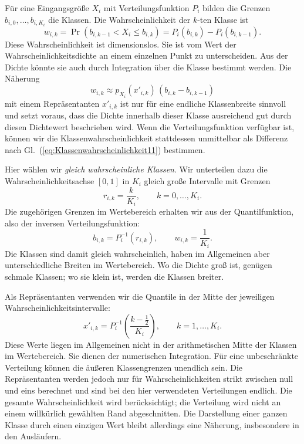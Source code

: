 Für eine Eingangsgröße $X_i$ mit Verteilungsfunktion $P_i$ bilden
die Grenzen $b_{i,0},\dots,b_{i,K_i}$ die Klassen.
Die Wahrscheinlichkeit der $k$-ten Klasse ist
\begin{equation}
w_{i,k}
=\Pr(b_{i,k-1}<X_i\leq b_{i,k})
=P_i(b_{i,k})-P_i(b_{i,k-1}).
\label{eq:Klassenwahrscheinlichkeit11}
\end{equation}
Diese Wahrscheinlichkeit ist dimensionslos. Sie ist vom Wert
der Wahrscheinlichkeitsdichte an einem einzelnen Punkt zu unterscheiden.
Aus der Dichte könnte sie auch durch Integration über die Klasse
bestimmt werden. Die Näherung
\begin{equation}
w_{i,k}\approx p_{X_i}(x'_{i,k})\,
(b_{i,k}-b_{i,k-1})
\end{equation}
mit einem Repräsentanten $x'_{i,k}$ ist nur für eine endliche
Klassenbreite sinnvoll und setzt voraus, dass die Dichte innerhalb
dieser Klasse ausreichend gut durch diesen Dichtewert beschrieben wird.
Wenn die Verteilungsfunktion verfügbar ist, können wir die
Klassenwahrscheinlichkeit stattdessen unmittelbar als Differenz
nach Gl.~(\ref{eq:Klassenwahrscheinlichkeit11}) bestimmen.

Hier wählen wir \emph{gleich wahrscheinliche Klassen}.
Wir unterteilen dazu die Wahrscheinlichkeitsachse $[0,1]$ in $K_i$
gleich große Intervalle mit Grenzen
\begin{equation}
r_{i,k}=\frac{k}{K_i},\qquad k=0,\dots,K_i.
\end{equation}
Die zugehörigen Grenzen im Wertebereich erhalten wir aus der
Quantilfunktion, also der inversen Verteilungsfunktion:
\begin{equation}
b_{i,k}=P_i^{-1}(r_{i,k}),
\qquad w_{i,k}=\frac{1}{K_i}.
\end{equation}
Die Klassen sind damit gleich wahrscheinlich, haben im Allgemeinen
aber unterschiedliche Breiten im Wertebereich.
Wo die Dichte groß ist, genügen schmale Klassen; wo sie klein ist,
werden die Klassen breiter.

Als Repräsentanten verwenden wir die Quantile in der Mitte der
jeweiligen Wahrscheinlichkeitsintervalle:
\begin{equation}
x'_{i,k}
=P_i^{-1}\!\left(\frac{k-\tfrac12}{K_i}\right),
\qquad k=1,\dots,K_i.
\label{eq:Quantilrepraesentanten11}
\end{equation}
Diese Werte liegen im Allgemeinen nicht in der arithmetischen Mitte
der Klassen im Wertebereich. Sie dienen der numerischen Integration.
Für eine unbeschränkte Verteilung können die äußeren Klassengrenzen
unendlich sein. Die Repräsentanten werden jedoch nur für
Wahrscheinlichkeiten strikt zwischen null und eins berechnet und
sind bei den hier verwendeten Verteilungen endlich.
Die gesamte Wahrscheinlichkeit wird berücksichtigt; die Verteilung
wird nicht an einem willkürlich gewählten Rand abgeschnitten.
Die Darstellung einer ganzen Klasse durch einen einzigen Wert
bleibt allerdings eine Näherung, insbesondere in den Ausläufern.

